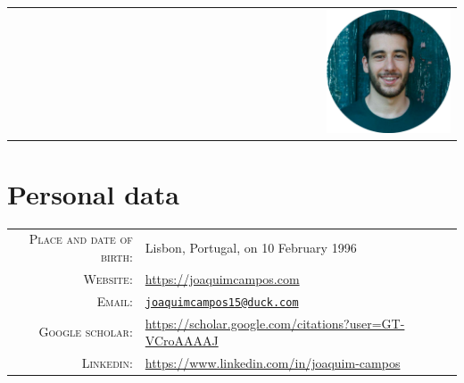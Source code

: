 \documentclass[a4paper,11pt]{article}
\begin{document}
  \pagestyle{empty}


  \begin{center}
    \begin{tabular}{lcr}
	    \par{\centering{\Huge Joaquim \textsc{Campos}}\bigskip\par} & & \includegraphics[width=0.3\textwidth]{../../images/Joaquim_circle.png} \\
    \end{tabular}
  \end{center}

  \vspace{15pt}

  \section{Personal data}

    \begin{tabular}{rl}
      \textsc{Place and date of birth:} & Lisbon, Portugal, on 10 February 1996 \\
      \textsc{Website:} & \url{https://joaquimcampos.com} \\
      \textsc{Email:} & \href{mailto:joaquimcampos15@duck.com}{\nolinkurl{joaquimcampos15@duck.com}} \\
      \textsc{Google scholar:} & \url{https://scholar.google.com/citations?user=GT-VCroAAAAJ} \\
      \textsc{Linkedin:} & \url{https://www.linkedin.com/in/joaquim-campos} \\
    \end{tabular}
\end{document}
